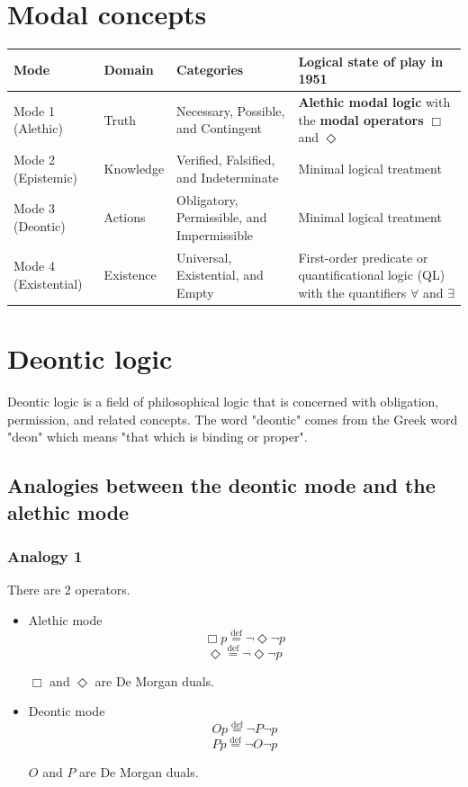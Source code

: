 \documentclass[11pt]{article}
\newcommand{\defequal}{\stackrel{\scriptscriptstyle\mathrm{def}}{=}}
\begin{document}
 \newpage
\section{Modal concepts}
\label{sec:org3695ff5}
\begin{center}
\begin{tabularx}{1.2\textwidth}{|X|X|X|X|}
\hline
Mode & Domain & Categories & Logical state of play in 1951\\
\hline
Mode 1 (Alethic) & Truth & Necessary, Possible, and Contingent & \textbf{Alethic modal logic} with the \textbf{modal operators} \(\Box\) and \(\Diamond\)\\
\hline
Mode 2 (Epistemic) & Knowledge & Verified, Falsified, and Indeterminate & Minimal logical treatment\\
\hline
Mode 3 (Deontic) & Actions & Obligatory, Permissible, and Impermissible & Minimal logical treatment\\
\hline
Mode 4 (Existential) & Existence & Universal, Existential, and Empty & First-order predicate or quantificational logic (QL) with the quantifiers \(\forall\) and \(\exists\)\\
\hline
\end{tabularx}
\end{center}

 \newpage
\section{Deontic logic}
\label{sec:orgbea2f6c}
Deontic logic is a field of philosophical logic that is concerned with obligation, permission, and related concepts. The word "deontic" comes from the Greek word "deon" which means "that which is binding or proper".
\subsection{Analogies between the deontic mode and the alethic mode}
\label{sec:org68c6ccd}

\subsubsection{Analogy 1}
\label{sec:org4552079}
There are 2 operators.
\begin{itemize}
\item Alethic mode
\[\Box p \defequal \neg \Diamond \neg p\]
\[\Diamond \defequal \neg \Diamond \neg p\]

\(\Box\) and \(\Diamond\) are De Morgan duals.

\item Deontic mode
\[Op \defequal \neg P \neg p\]
\[Pp \defequal \neg O \neg p\]

\(O\) and \(P\) are De Morgan duals.
\end{itemize}
\end{document}
